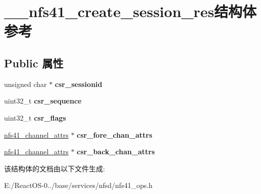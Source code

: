 \hypertarget{struct____nfs41__create__session__res}{}\section{\+\_\+\+\_\+nfs41\+\_\+create\+\_\+session\+\_\+res结构体 参考}
\label{struct____nfs41__create__session__res}
\subsection*{Public 属性}
\begin{DoxyCompactItemize}
\item 
\mbox{\label{struct____nfs41__create__session__res_aa9c139d303d0ee1ce9ec754f176f032b}} 
unsigned char $\ast$ {\bfseries csr\+\_\+sessionid}
\item 
\mbox{\label{struct____nfs41__create__session__res_abaf2cb13c90c74996f0c944908cd6d2a}} 
uint32\+\_\+t {\bfseries csr\+\_\+sequence}
\item 
\mbox{\label{struct____nfs41__create__session__res_a776edc48d943a1328c7292a7a419f809}} 
uint32\+\_\+t {\bfseries csr\+\_\+flags}
\item 
\mbox{\label{struct____nfs41__create__session__res_a4c5185bf38b71d0134ad42e9454b2709}} 
\hyperlink{struct____nfs41__channel__attrs}{nfs41\+\_\+channel\+\_\+attrs} $\ast$ {\bfseries csr\+\_\+fore\+\_\+chan\+\_\+attrs}
\item 
\mbox{\label{struct____nfs41__create__session__res_a243bb3aeb436b829cf15713c0f68ccdc}} 
\hyperlink{struct____nfs41__channel__attrs}{nfs41\+\_\+channel\+\_\+attrs} $\ast$ {\bfseries csr\+\_\+back\+\_\+chan\+\_\+attrs}
\end{DoxyCompactItemize}


该结构体的文档由以下文件生成\+:\begin{DoxyCompactItemize}
\item 
E\+:/\+React\+O\+S-\/0../base/services/nfsd/nfs41\+\_\+ops.\+h\end{DoxyCompactItemize}
